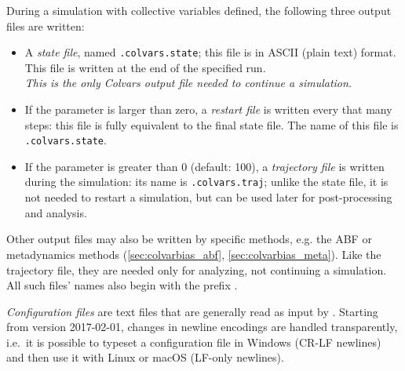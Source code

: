
During a simulation with collective variables defined, the following three output files are written:

\begin{itemize}

\item A \emph{state file}, named \outputName\texttt{.colvars.state}; this file is in ASCII (plain text) format.  This file is written at the end of the specified run.\\
  \emph{This is the only Colvars output file needed to continue a simulation.}

\item If the parameter  is larger than zero, a \emph{restart file} is written every that many steps: this file is fully equivalent to the final state file.
  The name of this file is \restartName\texttt{.colvars.state}.

\item If the parameter  is greater than 0 (default: 100), a \emph{trajectory file} is written during the simulation: its name is \outputName\texttt{.colvars.traj}; unlike the state file, it is not needed to restart a simulation, but can be used later for post-processing and analysis.

\end{itemize}

Other output files may also be written by specific methods, e.g.{} the ABF or metadynamics methods (\ref{sec:colvarbias_abf}, \ref{sec:colvarbias_meta}).
Like the trajectory file, they are needed only for analyzing, not continuing a simulation.
All such files' names also begin with the prefix \outputName.





\emph{Configuration files} are text files that are generally read as input by \MDENGINE{}.
Starting from version 2017-02-01, changes in newline encodings are handled transparently, i.e.\ it is possible to typeset a configuration file in Windows (CR-LF newlines) and then use it with Linux or macOS (LF-only newlines).

